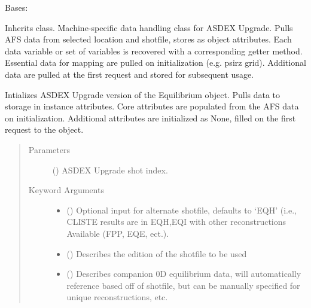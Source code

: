 \documentclass[letterpaper,10pt,english]{sphinxmanual}
\begin{document}
\begin{fulllineitems}
\label{\detokenize{eqtools:eqtools.AUGData.AUGDDData}}
Bases: {\hyperref[\detokenize{eqtools:eqtools.core.Equilibrium}]{}}

Inherits  class. Machine-specific data
handling class for ASDEX Upgrade. Pulls AFS data from selected location
and shotfile, stores as object attributes. Each data variable or set of
variables is recovered with a corresponding getter method. Essential data
for mapping are pulled on initialization (e.g. psirz grid). Additional
data are pulled at the first request and stored for subsequent usage.

Intializes ASDEX Upgrade version of the Equilibrium object.  Pulls data to
storage in instance attributes.  Core attributes are populated from the AFS
data on initialization.  Additional attributes are initialized as None,
filled on the first request to the object.
\begin{quote}\begin{description}
\item[{Parameters}] \leavevmode
{} () \textendash{} ASDEX Upgrade shot index.

\item[{Keyword Arguments}] \leavevmode\begin{itemize}
\item {} 
 () \textendash{} Optional input for alternate shotfile, defaults to ‘EQH’
(i.e., CLISTE results are in EQH,EQI with other reconstructions
Available (FPP, EQE, ect.).

\item {} 
 () \textendash{} Describes the edition of the shotfile to be used

\item {} 
 () \textendash{} Describes companion 0D equilibrium data, will automatically
reference based off of shotfile, but can be manually specified for
unique reconstructions, etc.


\end{itemize}
\end{description}
\end{quote}
\end{fulllineitems}
\end{document}
